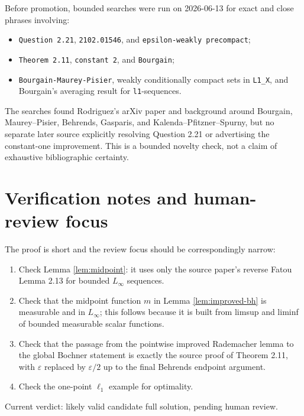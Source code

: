 \documentclass[11pt]{article}
\newcommand{\eps}{\varepsilon}
\begin{document}
Before promotion, bounded searches were run on 2026-06-13 for exact and close
phrases involving:
\begin{itemize}
\item \texttt{Question 2.21}, \texttt{2102.01546}, and
\texttt{epsilon-weakly precompact};
\item \texttt{Theorem 2.11}, \texttt{constant 2}, and \texttt{Bourgain};
\item \texttt{Bourgain-Maurey-Pisier}, weakly conditionally compact sets in
\texttt{L1\_X}, and Bourgain's averaging result for \texttt{l1}-sequences.
\end{itemize}
The searches found Rodriguez's arXiv paper and background around Bourgain,
Maurey--Pisier, Behrends, Gasparis, and Kalenda--Pfitzner--Spurny, but no
separate later source explicitly resolving Question 2.21 or advertising the
constant-one improvement. This is a bounded novelty check, not a claim of
exhaustive bibliographic certainty.

\section*{Verification notes and human-review focus}

The proof is short and the review focus should be correspondingly narrow:
\begin{enumerate}
\item Check Lemma \ref{lem:midpoint}: it uses only the source paper's reverse
Fatou Lemma 2.13 for bounded $L_\infty$ sequences.
\item Check that the midpoint function $m$ in Lemma \ref{lem:improved-bh} is
measurable and in $L_\infty$; this follows because it is built from limsup and
liminf of bounded measurable scalar functions.
\item Check that the passage from the pointwise improved Rademacher lemma to
the global Bochner statement is exactly the source proof of Theorem 2.11, with
$\eps$ replaced by $\eps/2$ up to the final Behrends endpoint argument.
\item Check the one-point $\ell_1$ example for optimality.
\end{enumerate}

Current verdict: likely valid candidate full solution, pending human review.
\end{document}
